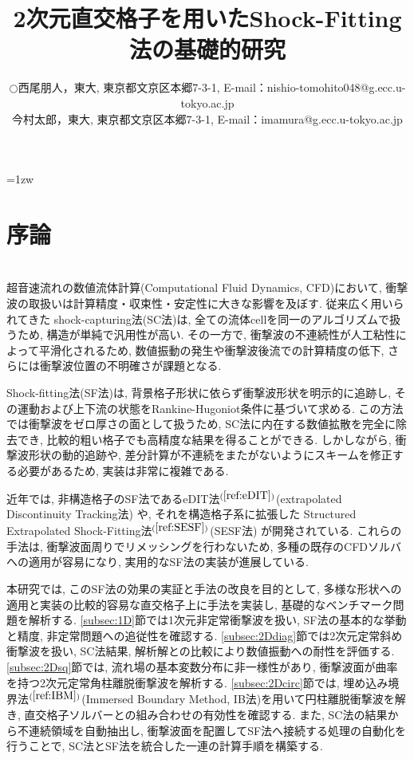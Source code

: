 \documentclass[a4j]{jarticle}
\title{2次元直交格子を用いたShock-Fitting法の基礎的研究}   %
\author{\begin{tabular}{cl}
$\bigcirc$ & 西尾朋人，東大, 
             東京都文京区本郷7-3-1, 
             E-mail：nishio-tomohito048@g.ecc.u-tokyo.ac.jp \\
           & 今村太郎，東大,
             東京都文京区本郷7-3-1, 
             E-mail：imamura@g.ecc.u-tokyo.ac.jp
\end{tabular} }
\begin{document}
\baselineskip=1zw
\maketitle

\section{序論} \label{sec:intro}
\mbox{}\\[-3.0ex]

超音速流れの数値流体計算(Computational Fluid Dynamics, CFD)において, 衝撃波の取扱いは計算精度・収束性・安定性に大きな影響を及ぼす.
従来広く用いられてきた shock-capturing法(SC法)は, 全ての流体cellを同一のアルゴリズムで扱うため, 構造が単純で汎用性が高い. 
その一方で, 衝撃波の不連続性が人工粘性によって平滑化されるため, 
数値振動の発生や衝撃波後流での計算精度の低下, さらには衝撃波位置の不明確さが課題となる.

Shock-fitting法(SF法)は, 背景格子形状に依らず衝撃波形状を明示的に追跡し, 
その運動および上下流の状態をRankine-Hugoniot条件に基づいて求める.
この方法では衝撃波をゼロ厚さの面として扱うため, SC法に内在する数値拡散を完全に除去でき, 
比較的粗い格子でも高精度な結果を得ることができる. 
しかしながら, 衝撃波形状の動的追跡や, 差分計算が不連続をまたがないようにスキームを修正する必要があるため, 
実装は非常に複雑である.

近年では, 非構造格子のSF法であるeDIT法$^{(\ref{ref:eDIT})}$(extrapolated Discontinuity Tracking法) や, 
それを構造格子系に拡張した Structured Extrapolated Shock-Fitting法$^{(\ref{ref:SESF})}$(SESF法) が開発されている.
これらの手法は, 衝撃波面周りでリメッシングを行わないため,  
多種の既存のCFDソルバへの適用が容易になり, 実用的なSF法の実装が進展している.

本研究では, このSF法の効果の実証と手法の改良を目的として, 多様な形状への適用と実装の比較的容易な直交格子上に手法を実装し, 
基礎的なベンチマーク問題を解析する.
\ref{subsec:1D}節では1次元非定常衝撃波を扱い, SF法の基本的な挙動と精度, 非定常問題への追従性を確認する.
\ref{subsec:2Ddiag}節では2次元定常斜め衝撃波を扱い, SC法結果, 解析解との比較により数値振動への耐性を評価する.
\ref{subsec:2Dsq}節では, 流れ場の基本変数分布に非一様性があり, 衝撃波面が曲率を持つ2次元定常角柱離脱衝撃波を解析する.
\ref{subsec:2Dcirc}節では, 埋め込み境界法$^{(\ref{ref:IBM})}$(Immersed Boundary Method, IB法)を用いて円柱離脱衝撃波を解き,
直交格子ソルバーとの組み合わせの有効性を確認する.
また, SC法の結果から不連続領域を自動抽出し, 衝撃波面を配置してSF法へ接続する処理の自動化を行うことで, 
SC法とSF法を統合した一連の計算手順を構築する.
\end{document}
